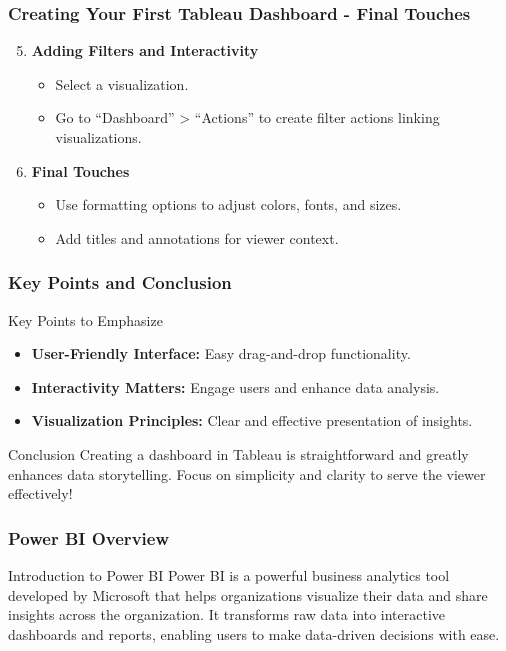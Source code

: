 \documentclass[aspectratio=169]{beamer}
\begin{document}
\begin{frame}[fragile]
    \frametitle{Creating Your First Tableau Dashboard - Final Touches}
    \begin{enumerate}
        \setcounter{enumi}{4}
        \item \textbf{Adding Filters and Interactivity}
        \begin{itemize}
            \item Select a visualization.
            \item Go to ``Dashboard'' > ``Actions'' to create filter actions linking visualizations.
        \end{itemize}

        \item \textbf{Final Touches}
        \begin{itemize}
            \item Use formatting options to adjust colors, fonts, and sizes.
            \item Add titles and annotations for viewer context.
        \end{itemize}
    \end{enumerate}
\end{frame}

\begin{frame}[fragile]
    \frametitle{Key Points and Conclusion}
    \begin{block}{Key Points to Emphasize}
        \begin{itemize}
            \item \textbf{User-Friendly Interface:} Easy drag-and-drop functionality.
            \item \textbf{Interactivity Matters:} Engage users and enhance data analysis.
            \item \textbf{Visualization Principles:} Clear and effective presentation of insights.
        \end{itemize}
    \end{block}

    \begin{block}{Conclusion}
        Creating a dashboard in Tableau is straightforward and greatly enhances data storytelling. Focus on simplicity and clarity to serve the viewer effectively!
    \end{block}
\end{frame}

\begin{frame}[fragile]
    \frametitle{Power BI Overview}
    \begin{block}{Introduction to Power BI}
        Power BI is a powerful business analytics tool developed by Microsoft that helps organizations visualize their data and share insights across the organization. It transforms raw data into interactive dashboards and reports, enabling users to make data-driven decisions with ease.
    \end{block}
\end{frame}
\end{document}
